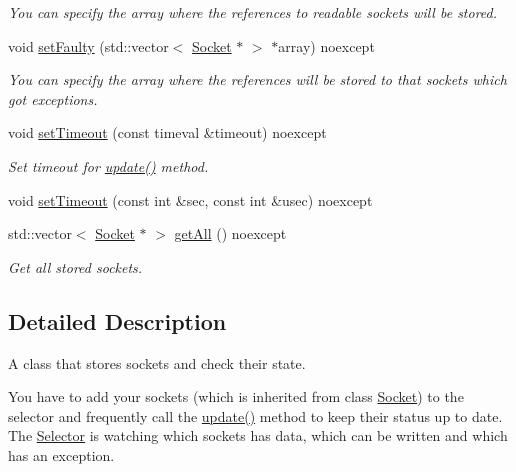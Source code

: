 \begin{DoxyCompactItemize}
\begin{DoxyCompactList}\small\item\em You can specify the array where the references to readable sockets will be stored. \end{DoxyCompactList}\item 
void \hyperlink{classtnnf_1_1_selector_a9634a32b113ffe1784ac893e07b8b53d}{set\+Faulty} (std\+::vector$<$ \hyperlink{classtnnf_1_1_socket}{Socket} $\ast$ $>$ $\ast$array) noexcept
\begin{DoxyCompactList}\small\item\em You can specify the array where the references will be stored to that sockets which got exceptions. \end{DoxyCompactList}\item 
void \hyperlink{classtnnf_1_1_selector_a88ea38e344d6ba504fe36e737f95290b}{set\+Timeout} (const timeval \&timeout) noexcept
\begin{DoxyCompactList}\small\item\em Set timeout for \hyperlink{classtnnf_1_1_selector_a56fd12ff21981124269b5bd5088af35e}{update()} method. \end{DoxyCompactList}\item 
void \hyperlink{classtnnf_1_1_selector_a35ab47e18c229cb81d9947692c8eefdd}{set\+Timeout} (const int \&sec, const int \&usec) noexcept
\item 
std\+::vector$<$ \hyperlink{classtnnf_1_1_socket}{Socket} $\ast$ $>$ \hyperlink{classtnnf_1_1_selector_ad8685ca66ee6eed19bb7de4f024b57df}{get\+All} () noexcept
\begin{DoxyCompactList}\small\item\em Get all stored sockets. \end{DoxyCompactList}\end{DoxyCompactItemize}


\subsection{Detailed Description}
A class that stores sockets and check their state. 

You have to add your sockets (which is inherited from class \hyperlink{classtnnf_1_1_socket}{Socket}) to the selector and frequently call the \hyperlink{classtnnf_1_1_selector_a56fd12ff21981124269b5bd5088af35e}{update()} method to keep their status up to date. The \hyperlink{classtnnf_1_1_selector}{Selector} is watching which sockets has data, which can be written and which has an exception. 

